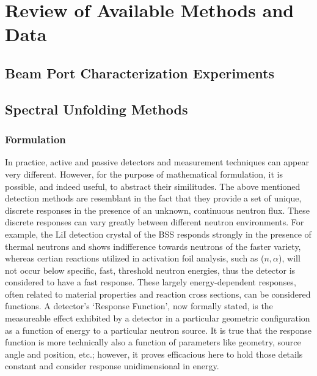 \cleardoublepage

\chapter{Review of Available Methods and Data}


\section{Beam Port Characterization Experiments}



\section{Spectral Unfolding Methods}


\subsection{Formulation}


In practice, active and passive detectors and measurement techniques can appear very different.
However, for the purpose of mathematical formulation, it is possible, and indeed useful, to abstract their similitudes.
The above mentioned detection methods are resemblant in the fact that they provide a set of unique, discrete responses in the presence of an unknown, continuous neutron flux.
These discrete responses can vary greatly between different neutron environments.
For example, the LiI detection crystal of the BSS responds strongly in the presence of thermal neutrons and shows indifference towards neutrons of the faster variety, whereas certian reactions utilized in activation foil analysis, such as ($n, \alpha$), will not occur below specific, fast, threshold neutron energies, thus the detector is considered to have a fast response.
These largely energy-dependent responses, often related to material properties and reaction cross sections, can be considered functions.
A detector's `Response Function', now formally stated, is the measureable effect exhibited by a detector in a particular geometric configuration as a function of energy to a particular neutron source.
It is true that the response function is more technically also a function of parameters like geometry, source angle and position, etc.; however, it proves efficacious here to hold those details constant and consider response unidimensional in energy.

